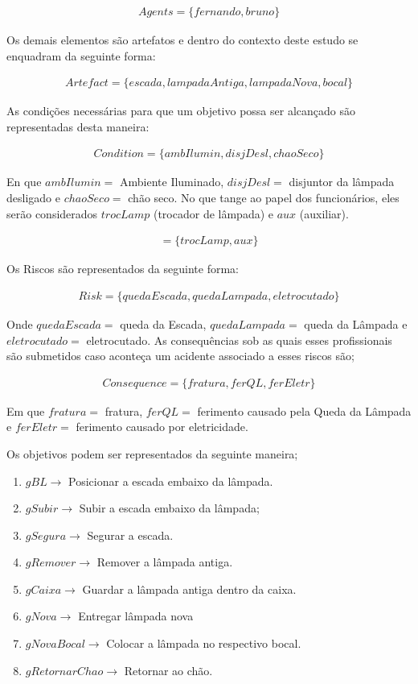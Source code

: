 \begin{eqnarray}\label{agentesintrodutorycase} \nonumber
	Agents = \{ fernando, bruno \}
\end{eqnarray}

Os demais elementos são artefatos e dentro do contexto deste estudo se enquadram da seguinte forma:

\begin{eqnarray}
	Artefact = \{ escada, lampadaAntiga, lampadaNova, bocal \} \nonumber
\end{eqnarray}

As condições necessárias para que um objetivo possa ser alcançado são representadas desta maneira: 

\begin{eqnarray}
	Condition = \{ ambIlumin, disjDesl, chaoSeco \} \nonumber
\end{eqnarray}

En que $ambIlumin =$ Ambiente Iluminado, $disjDesl = $ disjuntor da lâmpada desligado e $chaoSeco = $ chão seco. No que tange ao papel dos funcionários, eles serão considerados $trocLamp$ (trocador de lâmpada) e $aux$ (auxiliar).

\begin{eqnarray}
	= \{ trocLamp,aux \}
\end{eqnarray}

Os Riscos são representados da seguinte forma: 

\begin{eqnarray}
	Risk = \{ quedaEscada, quedaLampada, eletrocutado \}
\end{eqnarray}

Onde $quedaEscada =$ queda da Escada, $quedaLampada =$ queda da Lâmpada e $eletrocutado =$ eletrocutado. As consequências sob as quais esses profissionais são submetidos caso aconteça um acidente associado a esses riscos são;

\begin{eqnarray}
	Consequence = \{fratura,ferQL, ferEletr\}
\end{eqnarray}

Em que $fratura =$ fratura, $ferQL =$ ferimento causado pela Queda da Lâmpada e $ferEletr =$ ferimento causado por eletricidade.

Os objetivos podem ser representados da seguinte maneira; 

\begin{enumerate}
	\item $gBL \to $ Posicionar a escada embaixo da lâmpada.
	\item $gSubir \to $ Subir a escada embaixo da lâmpada;
	\item $gSegura \to $ Segurar a escada. 
	\item $gRemover \to $ Remover a lâmpada antiga.
	\item $gCaixa \to $ Guardar a lâmpada antiga dentro da caixa.
	\item $gNova \to $ Entregar lâmpada nova
	\item $gNovaBocal \to$ Colocar a lâmpada no respectivo bocal.
	\item $gRetornarChao \to$ Retornar ao chão.
\end{enumerate}

